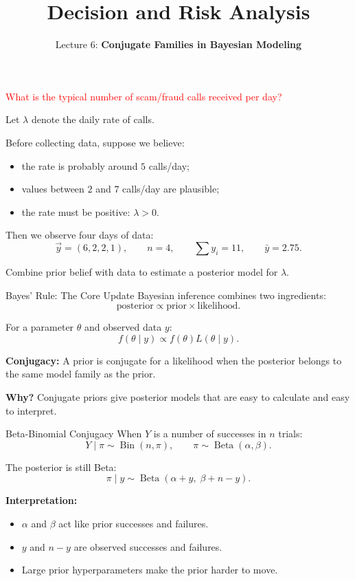 \documentclass[aspectratio=43,11pt]{beamer}
\title{Decision and Risk Analysis}
\subtitle{Lecture 6: \textbf{Conjugate Families in Bayesian Modeling}}
\author{}
\date{
\color{aggiemaroon}{
DAEN 427 / ISEN 427 / ISEN 627 - Fall 2026\\
\textbf{Alexander Abuabara}
}
}
\newcommand{\BetaDist}{\operatorname{Beta}}
\begin{document}
\begin{frame}
  \titlepage
\end{frame}

\begin{frame}{}
\textcolor{red}{What is the typical number of scam/fraud calls received per day?}

\pause
\medskip
Let $\lambda$ denote the daily rate of calls.

\medskip
Before collecting data, suppose we believe:
\begin{itemize}
  \item the rate is probably around $5$ calls/day;
  \item values between $2$ and $7$ calls/day are plausible;
  \item the rate must be positive: $\lambda > 0$.
\end{itemize}

\medskip
Then we observe four days of data:
\[
  \vec y=(6,2,2,1), \qquad n=4, \qquad \sum y_i=11, \qquad \bar y=2.75.
\]

Combine prior belief with data to estimate a posterior model for $\lambda$.
\end{frame}

\begin{frame}{Bayes' Rule: The Core Update}
Bayesian inference combines two ingredients:
\[
\text{posterior} \propto \text{prior} \times \text{likelihood}.
\]

\medskip
For a parameter $\theta$ and observed data $y$:
\[
  f(\theta\mid y) \propto f(\theta)L(\theta\mid y).
\]

\medskip
\textbf{Conjugacy:} A prior is conjugate for a likelihood when the posterior belongs to the same model family as the prior.

\medskip
\textbf{Why?} 
Conjugate priors give posterior models that are easy to calculate and easy to interpret.
\end{frame}

\begin{frame}{Beta-Binomial Conjugacy}
When $Y$ is a number of successes in $n$ trials:
\[
  Y\mid \pi \sim \operatorname{Bin}(n,\pi), \qquad \pi\sim \BetaDist(\alpha,\beta).
\]

The posterior is still Beta:
\[
  \pi\mid y \sim \BetaDist(\alpha+y,\;\beta+n-y).
\]

\medskip
\textbf{Interpretation:}
\begin{itemize}
  \item $\alpha$ and $\beta$ act like prior successes and failures.
  \item $y$ and $n-y$ are observed successes and failures.
  \item Large prior hyperparameters make the prior harder to move.
\end{itemize}
\end{frame}
\end{document}
